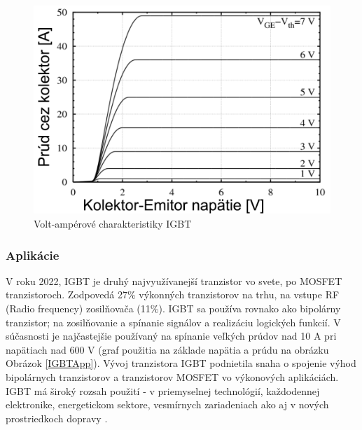 \begin{figure}[!htbp]
    \centering
    \includegraphics[width=12cm]{img/igbtgraph.PNG}
    \caption{Volt-ampérové charakteristiky IGBT \cite{c24}}
    \label{IGBTSGraph}
\end{figure}

\newpage

\subsubsection{Aplikácie}
V roku 2022, \acrshort{IGBT} je druhý najvyužívanejší tranzistor vo svete, po \acrshort{MOSFET} tranzistoroch. Zodpovedá 27\% výkonných tranzistorov na trhu, na vstupe RF (Radio frequency) zosilňovača (11\%). \acrshort{IGBT} sa používa rovnako ako bipolárny tranzistor; na zosilňovanie a spínanie signálov a realizáciu logických funkcií. V súčasnosti je najčastejšie používaný na spínanie veľkých prúdov nad 10 A pri napätiach nad 600 V (graf použitia na základe napätia a prúdu na obrázku Obrázok \ref{IGBTApp}). Vývoj tranzistora \acrshort{IGBT} podnietila snaha o spojenie výhod bipolárnych tranzistorov a tranzistorov \acrshort{MOSFET} vo výkonových aplikáciách. IGBT má široký rozsah použití - v priemyselnej technológií, každodennej elektronike, energetickom sektore, vesmírnych zariadeniach ako aj v nových prostriedkoch dopravy \cite{c23}.

